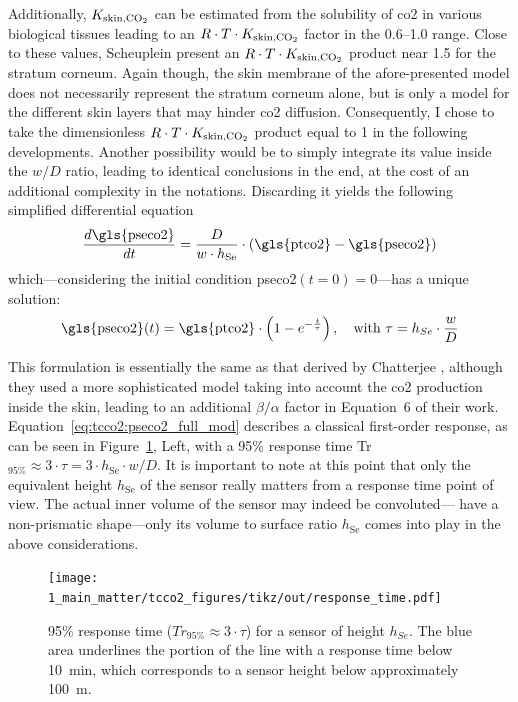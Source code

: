 Additionally, $K_\text{skin,\ce{CO_2}}$ can be estimated from the solubility of \gls{co2} in various biological tissues\cite{wright1934, nichols1957, scheuplein1976, gill1988} leading to an $R\cdot T\cdot K_\text{skin,\ce{CO_2}}$ factor in the 0.6--1.0 range. Close to these values, Scheuplein \etal{}\cite{scheuplein1976} present an $R\cdot T\cdot K_\text{skin,\ce{CO_2}}$ product near 1.5 for the stratum corneum. Again though, the skin membrane of the afore-presented model does not necessarily represent the stratum corneum alone, but is only a model for the different skin layers that may hinder \gls{co2} diffusion. Consequently, I chose to take the dimensionless $R\cdot T\cdot K_\text{skin,\ce{CO_2}}$ product equal to 1 in the following developments. Another possibility would be to simply integrate its value inside the $w/D$ ratio, leading to identical conclusions in the end, at the cost of an additional complexity in the notations. Discarding it yields the following simplified differential equation
\begin{equation}
	\frac{d \text{\gls{pseco2}}}{dt} = \frac{D}{w \cdot h_\text{Se}} \cdot \left( \text{\gls{ptco2}} - \text{\gls{pseco2}} \right)
\end{equation}
which---considering the initial condition \gls{pseco2}$(t=0)=0$---has a unique solution:
\begin{equation}\label{eq:tcco2:pseco2_full_mod}
	\text{\gls{pseco2}}(t) = \text{\gls{ptco2}} \cdot \left( 1 - e^{-\frac{t}{\tau}} \right), \quad \text{with } \tau = h_{Se} \cdot \frac{w}{D}
\end{equation}

This formulation is essentially the same as that derived by Chatterjee \etal{}\cite{chatterjee2015}, although they used a more sophisticated model taking into account the \gls{co2} production inside the skin, leading to an additional $\beta/\alpha$ factor in Equation~6 of their work. Equation~\ref{eq:tcco2:pseco2_full_mod} describes a classical first-order response, as can be seen in Figure~\ref{fig:tcco2:response_time}, Left, with a 95\% response time Tr$_{95\%}\approx 3\cdot \tau = 3 \cdot h_\text{Se} \cdot w / D$. It is important to note at this point that only the equivalent height $h_\text{Se}$ of the sensor really matters from a response time point of view. The actual inner volume of the sensor may indeed be convoluted---\ie{} have a non-prismatic shape---only its volume to surface ratio $h_\text{Se}$ comes into play in the above considerations.

\begin{figure}
	\centering
	\texttt{[image: 1\_main\_matter/tcco2\_figures/tikz/out/response\_time.pdf]}
	\caption[Influence of a transcutaneous sensor's height on its response time.]{95\% response time ($Tr_{95\%} \approx 3\cdot \tau$) for a sensor of height $h_{Se}$. The blue area underlines the portion of the line with a response time below 10~min, which corresponds to a sensor height below approximately 100~\textmu{}m.}
	\label{fig:tcco2:response_time}
\end{figure}


